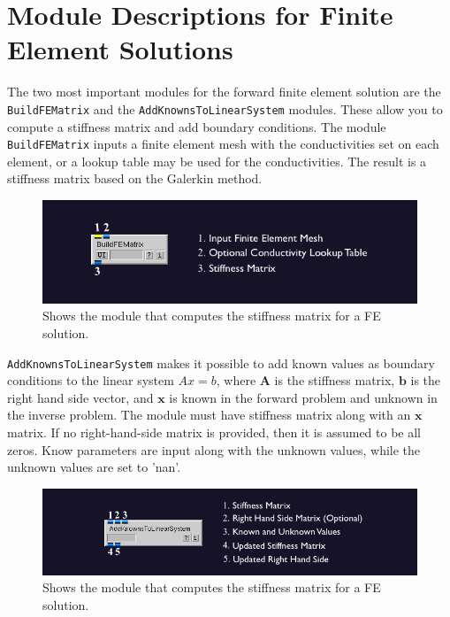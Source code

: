 \section{Module Descriptions for Finite Element Solutions}

The two most important modules for the forward finite element solution are the {\tt BuildFEMatrix}
and the {\tt AddKnownsToLinearSystem} modules. These allow you to compute a stiffness matrix and add boundary conditions. The module {\tt BuildFEMatrix} inputs a finite element mesh with the conductivities set on each element, or a lookup table may be used for the conductivities. The result is a stiffness matrix based on the Galerkin method.

\begin{figure}[H]
\begin{center}
\includegraphics[width=\textwidth]{ECGToolkitGuide_figures/FEMmod.png}
\caption{Shows the module that computes the stiffness matrix for a FE solution.}
\label{FEM}
\end{center}
\end{figure}

{\tt AddKnownsToLinearSystem} makes it possible to add known values as boundary conditions
to the linear system $Ax=b$, where $\mathbf{A}$ is the stiffness matrix, $\mathbf{b}$ is the right hand side vector, and
$\mathbf{x}$ is known in the forward problem and unknown in the inverse problem. The module must have stiffness matrix along with an $\mathbf{x}$ matrix. If no right-hand-side matrix is provided, then it is assumed to be all zeros. Know parameters are input along with the unknown values, while the unknown
values are set to 'nan'.

\begin{figure}[H]
\begin{center}
\includegraphics[width=\textwidth]{ECGToolkitGuide_figures/AddKnowns.png}
\caption{Shows the module that computes the stiffness matrix for a FE solution.}
\label{AddKnowns}
\end{center}
\end{figure}


